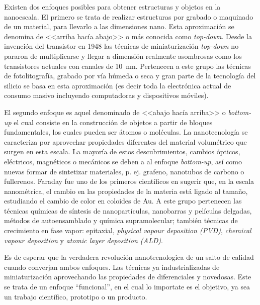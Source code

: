  	\pagebreak	    
 		    	
	Existen dos enfoques posibles para obtener estructuras y objetos en la nanoescala. El primero se trata de realizar estructuras por grabado o maquinado de un material, para llevarlo a las dimensiones nano. Esta aproximación se denomina de <<arriba hacía abajo>> o más conocida como \textit{top-down}. Desde la invención del transistor en 1948 las técnicas de miniaturización \textit{top-down} no pararon de multiplicarse y llegar a dimensión realmente asombrosas como los transistores actuales con canales de \SI{10}{nm}. Pertenecen a este grupo las técnicas de fotolitografía, grabado por vía húmeda o seca y gran parte de la tecnología del silicio se basa en esta aproximación (es decir toda la electrónica actual de consumo masivo incluyendo computadoras y dispositivos móviles). 

	El segundo enfoque es aquel denominado de <<abajo hacía arriba>> o \textit{bottom-up} el cual consiste en la construcción de objetos a partir de bloques fundamentales, los cuales pueden ser átomos o moléculas. La nanotecnología se caracteriza por aprovechar propiedades diferentes del material volumétrico que surgen en esta escala. La mayoría de estos descubrimientos, cambios ópticos, eléctricos, magnéticos o mecánicos se deben a al enfoque \textit{bottom-up}, así como nuevas formar de sintetizar materiales, p. ej. grafeno, nanotubos de carbono o fullerenos. Faraday fue uno de los primeros científicos en sugerir que, en la escala nanométrica, el cambio en las propiedades de la materia está ligado al tamaño, estudiando el cambio de color en coloides de Au\cite{faraday1857}. A este grupo pertenecen las técnicas químicas de síntesis de nanopartículas, nanobarras y películas delgadas, métodos de autoensamblado y química supramolecular; también técnicas de crecimiento en fase vapor: epitaxial, \textit{physical vapour deposition (PVD)}, \textit{chemical vapour deposition} y \textit{atomic layer deposition (ALD)}.
			
	Es de esperar que la verdadera revolución nanotecnologica de un salto de calidad cuando converjan ambos enfoques. Las técnicas ya industrializadas de miniaturización aprovechando las propiedades de diferenciales y novedosas. Este se trata de un enfoque ``funcional'', en el cual lo importate es el objetivo, ya sea un trabajo científico, prototipo o un producto.

